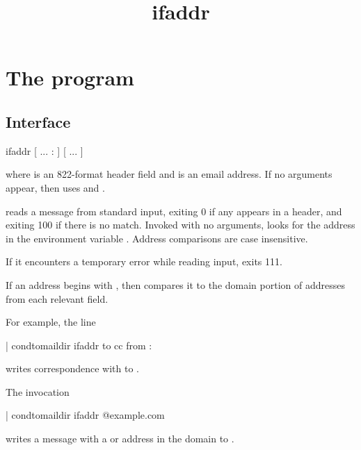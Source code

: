 \documentclass{book}
\title{ifaddr}
\begin{document}
\section{The  program}

\subsection{Interface}
\begin{code}%
  ifaddr [  ... : ] [  ... ]
\end{code}
where  is an 822-format header field and  is an email
address.  If no  arguments appear, then  uses
 and .

 reads a message from standard input, exiting 0 if any 
appears in a  header, and exiting 100 if there is no match.  Invoked
with no  arguments,  looks for the address in the
environment variable .  Address comparisons are case
insensitive.

If it encounters a temporary error while reading input,  exits 111.

If an address begins with , then  compares it to the domain
portion of addresses from each relevant field.


For example, the  line
\begin{code}%
  | condtomaildir  ifaddr to cc from : 
\end{code}
writes correspondence with  to .

The invocation
\begin{code}%
  | condtomaildir  ifaddr @example.com
\end{code}
writes a message with a  or  address in the domain
 to .
\end{document}
